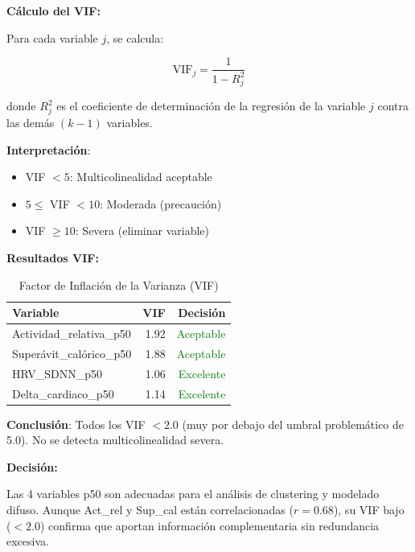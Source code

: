 \documentclass[12pt,letterpaper,twoside]{report}
\begin{document}
\begin{estadisticobox}
\textbf{Cálculo del VIF:}

Para cada variable $j$, se calcula:

\begin{equation}
\text{VIF}_j = \frac{1}{1 - R^2_j}
\end{equation}

donde $R^2_j$ es el coeficiente de determinación de la regresión de la variable $j$ contra las demás $(k-1)$ variables.

\textbf{Interpretación}:
\begin{itemize}[noitemsep]
    \item VIF $< 5$: Multicolinealidad aceptable
    \item $5 \leq$ VIF $< 10$: Moderada (precaución)
    \item VIF $\geq 10$: Severa (eliminar variable)
\end{itemize}
\end{estadisticobox}

\begin{calculobox}
\textbf{Resultados VIF:}

\begin{table}[H]
\centering
\caption{Factor de Inflación de la Varianza (VIF)}
\label{tab:vif}
\begin{tabular}{@{}lrr@{}}
\toprule
\textbf{Variable} & \textbf{VIF} & \textbf{Decisión} \\
\midrule
Actividad\_relativa\_p50     & 1.92 & \textcolor{green}{Aceptable} \\
Superávit\_calórico\_p50     & 1.88 & \textcolor{green}{Aceptable} \\
HRV\_SDNN\_p50               & 1.06 & \textcolor{green}{Excelente} \\
Delta\_cardiaco\_p50         & 1.14 & \textcolor{green}{Excelente} \\
\bottomrule
\end{tabular}
\end{table}

\textbf{Conclusión}: Todos los VIF $< 2.0$ (muy por debajo del umbral problemático de 5.0). No se detecta multicolinealidad severa.
\end{calculobox}

\begin{decisionbox}
\textbf{Decisión:}

Las 4 variables p50 son adecuadas para el análisis de clustering y modelado difuso. Aunque Act\_rel y Sup\_cal están correlacionadas ($r=0.68$), su VIF bajo ($<2.0$) confirma que aportan información complementaria sin redundancia excesiva.
\end{decisionbox}
\end{document}
